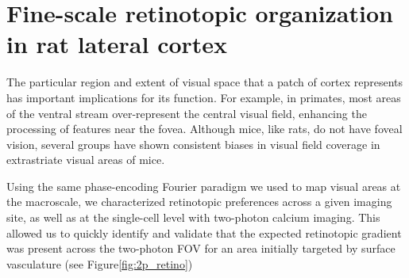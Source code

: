 \section{Fine-scale retinotopic organization in rat lateral cortex}
The particular region and extent of visual space that a patch of cortex represents has important implications for its function. For example, in primates, most areas of the ventral stream over-represent the central visual field, enhancing the processing of features near the fovea\cite{REFREF, Gattass2005CorticalDynamics}. Although mice, like rats, do not have foveal vision, several groups have shown consistent biases in visual field coverage in extrastriate visual areas of mice\cite{Garrett2014, Marshel2011, REFREF}. 

Using the same phase-encoding Fourier paradigm we used to map visual areas at the macroscale, we characterized retinotopic preferences across a given imaging site, as well as at the single-cell level with two-photon calcium imaging. This allowed us to quickly identify and validate that the expected retinotopic gradient was present across the two-photon FOV for an area initially targeted by surface vasculature (see Figure\ref{fig:2p_retino}) 

